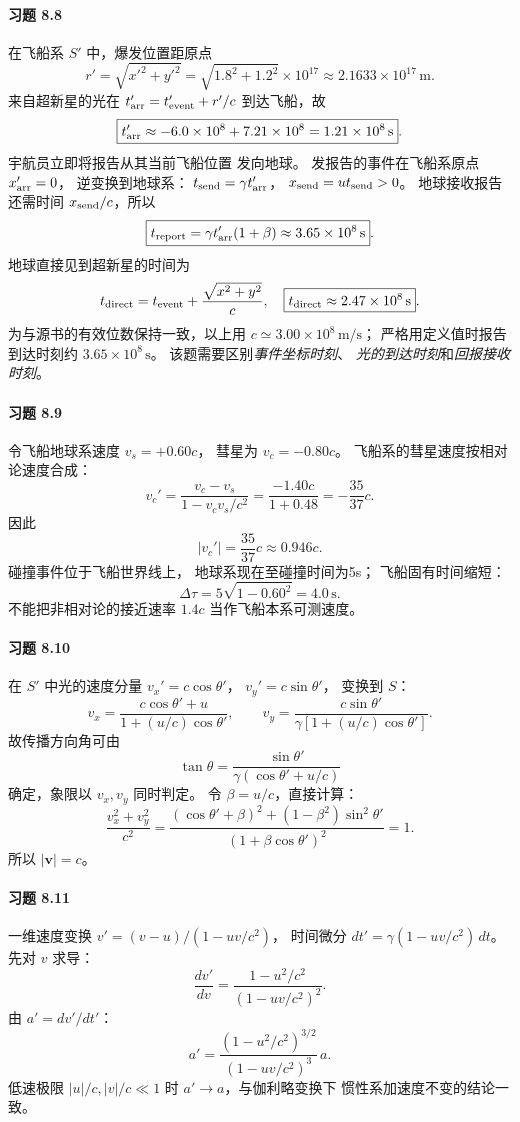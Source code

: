 \paragraph{习题 8.8}
在飞船系 \(S'\) 中，爆发位置距原点
\[
 r'=\sqrt{x'^2+y'^2}
 =\sqrt{1.8^2+1.2^2}\times10^{17}
 \approx2.1633\times10^{17}\,\mathrm m.
\]
来自超新星的光在
\(t'_{\rm arr}=t'_{\rm event}+r'/c\)
到达飞船，故
\[
 \boxed{t'_{\rm arr}\approx
 -6.0\times10^8+7.21\times10^8
 =1.21\times10^8\,\mathrm s}.
\]
宇航员立即将报告从其当前飞船位置
发向地球。
发报告的事件在飞船系原点
\(x'_{\rm arr}=0\)，
逆变换到地球系：
\(t_{\rm send}=\gamma t'_{\rm arr}\)，
\(x_{\rm send}=u t_{\rm send}>0\)。
地球接收报告还需时间
\(x_{\rm send}/c\)，所以
\[
 \boxed{t_{\rm report}=
 \gamma t'_{\rm arr}(1+\beta)
 \approx3.65\times10^8\,\mathrm s}.
\]
地球直接见到超新星的时间为
\[
 t_{\rm direct}=t_{\rm event}
 +\frac{\sqrt{x^2+y^2}}c,
\quad
 \boxed{t_{\rm direct}\approx2.47\times10^8\,\mathrm s}.
\]
为与源书的有效位数保持一致，以上用
\(c\simeq3.00\times10^8\,\mathrm{m/s}\)；
严格用定义值时报告到达时刻约
\(3.65\times10^8\,\mathrm s\)。
该题需要区别\emph{事件坐标时刻}、
\emph{光的到达时刻}和\emph{回报接收时刻}。

\paragraph{习题 8.9}
令飞船地球系速度 \(v_s=+0.60c\)，
彗星为 \(v_c=-0.80c\)。
飞船系的彗星速度按相对论速度合成：
\[
 v_c'=\frac{v_c-v_s}{1-v_cv_s/c^2}
 =\frac{-1.40c}{1+0.48}
 =-\frac{35}{37}c.
\]
因此
\[
 \boxed{|v_c'|=\frac{35}{37}c\approx0.946c}.
\]
碰撞事件位于飞船世界线上，
地球系现在至碰撞时间为5s；
飞船固有时间缩短：
\[
 \boxed{\Delta\tau=5\sqrt{1-0.60^2}
 =4.0\,\mathrm s}.
\]
不能把非相对论的接近速率 \(1.4c\)
当作飞船本系可测速度。

\paragraph{习题 8.10}
在 \(S'\) 中光的速度分量
\(v_x'=c\cos\theta'\)，
\(v_y'=c\sin\theta'\)，
变换到 \(S\)：
\[
 v_x=\frac{c\cos\theta'+u}
 {1+(u/c)\cos\theta'},\qquad
 v_y=\frac{c\sin\theta'}
 {\gamma[1+(u/c)\cos\theta']}.
\]
故传播方向角可由
\[
 \boxed{\tan\theta=
 \frac{\sin\theta'}{\gamma(\cos\theta'+u/c)}}
\]
确定，象限以 \(v_x,v_y\) 同时判定。
令 \(\beta=u/c\)，直接计算：
\[
 \frac{v_x^2+v_y^2}{c^2}
 =\frac{(\cos\theta'+\beta)^2
 +(1-\beta^2)\sin^2\theta'}
 {(1+\beta\cos\theta')^2}=1.
\]
所以 \(\boxed{|\boldsymbol v|=c}\)。

\paragraph{习题 8.11}
一维速度变换
\(v'=(v-u)/(1-uv/c^2)\)，
时间微分
\(dt'=\gamma(1-uv/c^2)\,dt\)。
先对 \(v\) 求导：
\[
 \frac{dv'}{dv}=
 \frac{1-u^2/c^2}{(1-uv/c^2)^2}.
\]
由 \(a'=dv'/dt'\)：
\[
 \boxed{a'=
 \frac{(1-u^2/c^2)^{3/2}}
 {(1-uv/c^2)^3}\,a}.
\]
低速极限
\(|u|/c,|v|/c\ll1\) 时
\(a'\to a\)，与伽利略变换下
惯性系加速度不变的结论一致。

